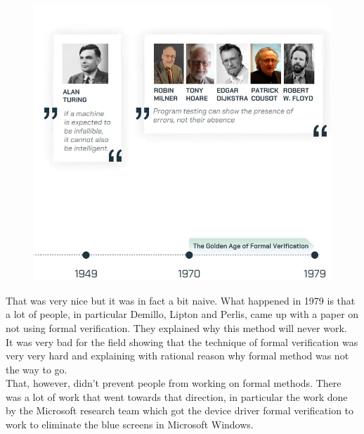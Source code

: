 \documentclass[oneside]{book}
\begin{document}
    \begin{figure}[htbp!]
        \centering
        \includegraphics[width=\linewidth]{img/formal_verification_history_1}
    \end{figure}

    That was very nice but it was in fact a bit naive.
    What happened in 1979 is that a lot of people, in particular Demillo, Lipton and Perlis, came up with a paper on not using formal verification.
    They explained why this method will never work.\\

    It was very bad for the field showing that the technique of formal verification was very very hard and explaining with rational reason why formal method was not the way to go.\\

    That, however, didn't prevent people from working on formal methods.
    There was a lot of work that went towards that direction, in particular the work done by the Microsoft research team which got the device driver formal verification to work to eliminate the blue screens in Microsoft Windows.\\

    \vfill
\end{document}
